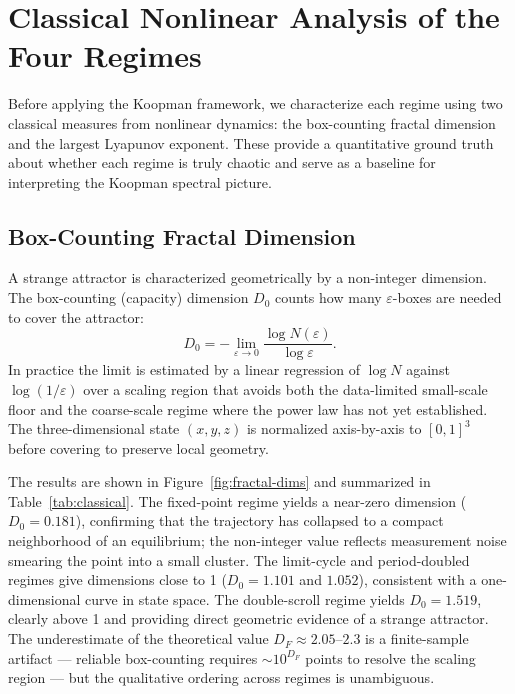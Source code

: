 \documentclass[11pt]{article}
\begin{document}
\section{Classical Nonlinear Analysis of the Four Regimes}

Before applying the Koopman framework, we characterize each regime using two classical measures from nonlinear dynamics: the box-counting fractal dimension and the largest Lyapunov exponent. These provide a quantitative ground truth about whether each regime is truly chaotic and serve as a baseline for interpreting the Koopman spectral picture.

\subsection{Box-Counting Fractal Dimension}

A strange attractor is characterized geometrically by a non-integer dimension. The box-counting (capacity) dimension $D_0$ counts how many $\varepsilon$-boxes are needed to cover the attractor:
\begin{equation}
    D_0 = -\lim_{\varepsilon \to 0} \frac{\log N(\varepsilon)}{\log \varepsilon}.
\end{equation}
In practice the limit is estimated by a linear regression of $\log N$ against $\log(1/\varepsilon)$ over a scaling region that avoids both the data-limited small-scale floor and the coarse-scale regime where the power law has not yet established. The three-dimensional state $(x, y, z)$ is normalized axis-by-axis to $[0,1]^3$ before covering to preserve local geometry.

The results are shown in Figure~\ref{fig:fractal-dims} and summarized in Table~\ref{tab:classical}. The fixed-point regime yields a near-zero dimension ($D_0 = 0.181$), confirming that the trajectory has collapsed to a compact neighborhood of an equilibrium; the non-integer value reflects measurement noise smearing the point into a small cluster. The limit-cycle and period-doubled regimes give dimensions close to 1 ($D_0 = 1.101$ and $1.052$), consistent with a one-dimensional curve in state space. The double-scroll regime yields $D_0 = 1.519$, clearly above 1 and providing direct geometric evidence of a strange attractor. The underestimate of the theoretical value $D_F \approx 2.05$--$2.3$ \citep{chua1986} is a finite-sample artifact --- reliable box-counting requires $\sim 10^{D_F}$ points to resolve the scaling region --- but the qualitative ordering across regimes is unambiguous.
\end{document}
